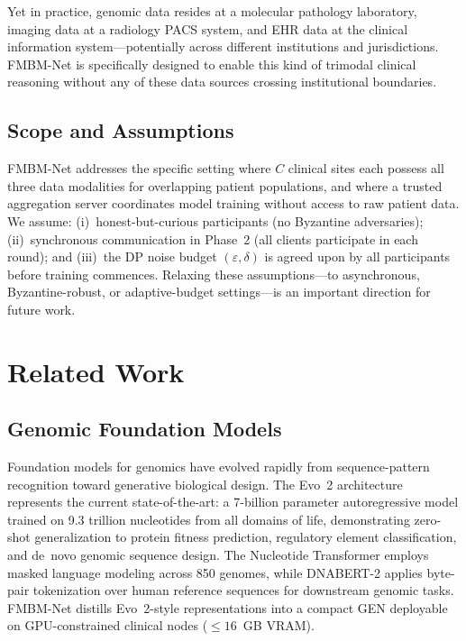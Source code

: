 \documentclass[a4paper,fleqn]{cas-dc}
\begin{document}
Yet in practice, genomic data resides at a molecular pathology laboratory,
imaging data at a radiology PACS system, and EHR data at the clinical
information system---potentially across different institutions and jurisdictions.
FMBM-Net is specifically designed to enable this kind of trimodal clinical
reasoning without any of these data sources crossing institutional boundaries.

\subsection{Scope and Assumptions}

FMBM-Net addresses the specific setting where $C$ clinical sites each possess
all three data modalities for overlapping patient populations, and where a
trusted aggregation server coordinates model training without access to raw
patient data. We assume: (i)~honest-but-curious participants (no Byzantine
adversaries); (ii)~synchronous communication in Phase~2 (all clients
participate in each round); and (iii)~the DP noise budget $(\varepsilon,\delta)$
is agreed upon by all participants before training commences. Relaxing these
assumptions---to asynchronous, Byzantine-robust, or adaptive-budget
settings---is an important direction for future work.

\section{Related Work}
\label{sec:related}

\subsection{Genomic Foundation Models}

Foundation models for genomics have evolved rapidly from sequence-pattern
recognition toward generative biological design.
The Evo~2 architecture \citep{evo2_2026} represents the current
state-of-the-art: a 7-billion parameter autoregressive model trained on 9.3
trillion nucleotides from all domains of life, demonstrating zero-shot
generalization to protein fitness prediction, regulatory element classification,
and de~novo genomic sequence design. The Nucleotide
Transformer \citep{nucleotide_transformer_2023} employs masked language modeling
across 850 genomes, while DNABERT-2 \citep{zhou2024dnabert2} applies byte-pair
tokenization over human reference sequences for downstream genomic tasks.
FMBM-Net distills Evo~2-style representations into a compact GEN deployable
on GPU-constrained clinical nodes ($\leq\!16$~GB VRAM).
\end{document}
